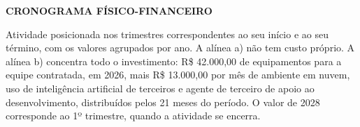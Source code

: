 \documentclass[12pt,a4paper]{article}
\newcommand{\secao}[1]{%
  \par\vspace{\dimexpr16pt-\parskip\relax}%
  {\noindent\bfseries\color{azulTitulo}\fontsize{13}{16}\selectfont #1}%
  \par\vspace{\dimexpr8pt-\parskip\relax}%
}
\begin{document}
%
%
%
\secao{CRONOGRAMA FÍSICO-FINANCEIRO}

Atividade posicionada nos trimestres correspondentes ao seu início e ao seu término, com os valores agrupados por ano. A alínea a) não tem custo próprio. A alínea b) concentra todo o investimento: R\$ 42.000,00 de equipamentos para a equipe contratada, em 2026, mais R\$ 13.000,00 por mês de ambiente em nuvem, uso de inteligência artificial de terceiros e agente de terceiro de apoio ao desenvolvimento, distribuídos pelos 21 meses do período. O valor de 2028 corresponde ao 1º trimestre, quando a atividade se encerra.
\end{document}
